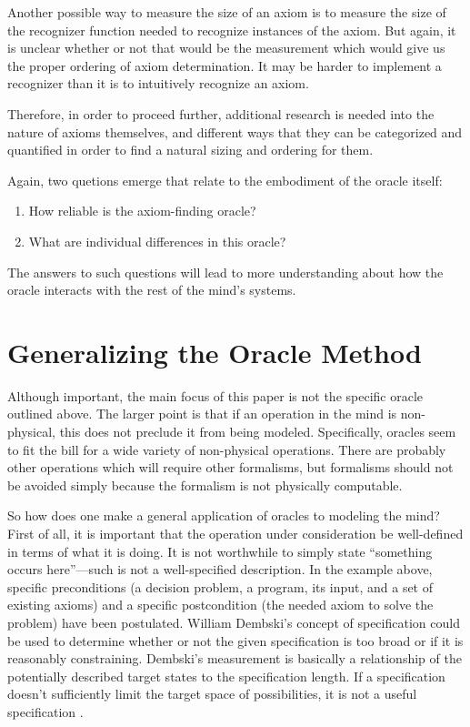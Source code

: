 Another possible way to measure the size of an axiom is to measure the size of the recognizer function needed to recognize instances of the axiom.  But again, it is unclear whether or not that would be the measurement which would give us the proper ordering of axiom determination.  It may be harder to implement a recognizer than it is to intuitively recognize an axiom. 

Therefore, in order to proceed further, additional research is needed into the nature of axioms themselves, and different ways that they can be categorized and quantified in order to find a natural sizing and ordering for them.


Again, two quetions emerge that relate to the embodiment of the oracle itself:

\begin{enumerate}
\item How reliable is the axiom-finding oracle?
\item What are individual differences in this oracle?
\end{enumerate}

The answers to such questions will lead to more understanding about how the oracle interacts with the rest of the mind's systems.

\section{Generalizing the Oracle Method}

Although important, the main focus of this paper is not the specific oracle outlined above.  The larger point is that if an operation in the mind is non-physical, this does not preclude it from being modeled.  Specifically, oracles seem to fit the bill for a wide variety of non-physical operations.  There are probably other operations which will require other formalisms, but formalisms should not be avoided simply because the formalism is not physically computable.  

So how does one make a general application of oracles to modeling the mind?  First of all, it is important that the operation under consideration be well-defined in terms of what it is doing.  It is not worthwhile to simply state ``something occurs here''---such is not a well-specified description.  In the example above, specific preconditions (a decision problem, a program, its input, and a set of existing axioms) and a specific postcondition (the needed axiom to solve the problem) have been postulated.  William Dembski's concept of specification could be used to determine whether or not the given specification is too broad or if it is reasonably constraining.  Dembski's measurement is basically a relationship of the potentially described target states to the specification length.  If a specification doesn't sufficiently limit the target space of possibilities, it is not a useful specification \citep{dembski2005}.  

